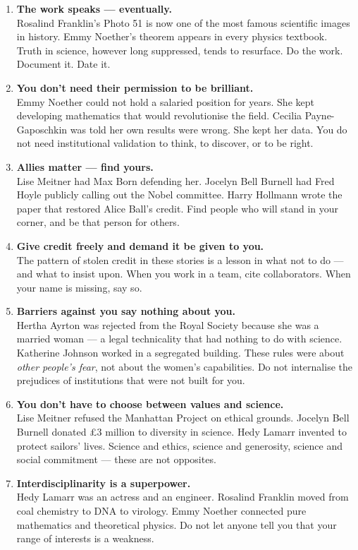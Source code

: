 \documentclass[12pt,a4paper]{article}
\begin{document}
\begin{enumerate}[leftmargin=*, label=\textbf{\large\color{deepplum}\arabic*.}, itemsep=12pt]

\item \textbf{The work speaks — eventually.}\\
Rosalind Franklin's Photo 51 is now one of the most famous scientific images in history. Emmy Noether's theorem appears in every physics textbook. Truth in science, however long suppressed, tends to resurface. Do the work. Document it. Date it.

\item \textbf{You don't need their permission to be brilliant.}\\
Emmy Noether could not hold a salaried position for years. She kept developing mathematics that would revolutionise the field. Cecilia Payne-Gaposchkin was told her own results were wrong. She kept her data. You do not need institutional validation to think, to discover, or to be right.

\item \textbf{Allies matter — find yours.}\\
Lise Meitner had Max Born defending her. Jocelyn Bell Burnell had Fred Hoyle publicly calling out the Nobel committee. Harry Hollmann wrote the paper that restored Alice Ball's credit. Find people who will stand in your corner, and be that person for others.

\item \textbf{Give credit freely and demand it be given to you.}\\
The pattern of stolen credit in these stories is a lesson in what not to do — and what to insist upon. When you work in a team, cite collaborators. When your name is missing, say so.

\item \textbf{Barriers against you say nothing about you.}\\
Hertha Ayrton was rejected from the Royal Society because she was a married woman — a legal technicality that had nothing to do with science. Katherine Johnson worked in a segregated building. These rules were about \emph{other people's fear}, not about the women's capabilities. Do not internalise the prejudices of institutions that were not built for you.

\item \textbf{You don't have to choose between values and science.}\\
Lise Meitner refused the Manhattan Project on ethical grounds. Jocelyn Bell Burnell donated \pounds3 million to diversity in science. Hedy Lamarr invented to protect sailors' lives. Science and ethics, science and generosity, science and social commitment — these are not opposites.

\item \textbf{Interdisciplinarity is a superpower.}\\
Hedy Lamarr was an actress and an engineer. Rosalind Franklin moved from coal chemistry to DNA to virology. Emmy Noether connected pure mathematics and theoretical physics. Do not let anyone tell you that your range of interests is a weakness.

\end{enumerate}
\end{document}
